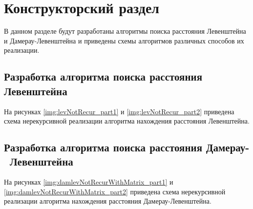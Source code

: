 \chapter{Конструкторский раздел}

В данном разделе будут разработаны алгоритмы поиска расстояния Левенштейна и Дамерау-Левенштейна и приведены схемы алгоритмов различных способов их реализации.

\section{Разработка алгоритма поиска расстояния Левенштейна}

На рисунках \ref{img:levNotRecur_part1} и \ref{img:levNotRecur_part2}
приведена схема нерекурсивной реализации алгоритма нахождения расстояния Левенштейна.



\clearpage

\section{Разработка алгоритма поиска расстояния Дамерау- Левенштейна}

На рисунках \ref{img:damlevNotRecurWithMatrix_part1} и \ref{img:damlevNotRecurWithMatrix_part2}
приведена схема нерекурсивной реализации алгоритма нахождения расстояния Дамерау-Левенштейна.



